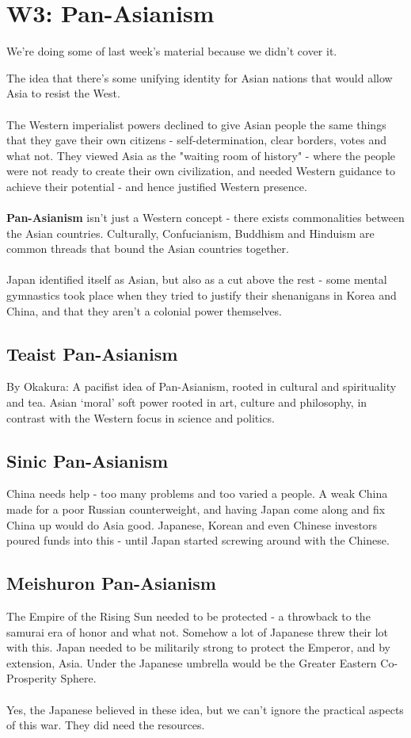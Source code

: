 \documentclass[a4paper]{article}
\begin{document}
\section{W3: Pan-Asianism}
\begin{displayquote}
	We're doing some of last week's material because we didn't cover it.
\end{displayquote}
The idea that there's some unifying identity for Asian nations that would allow Asia to resist the West.\\
\\
The Western imperialist powers declined to give Asian people the same things that they gave their own citizens - self-determination, clear borders, votes and what not. They viewed Asia as the "waiting room of history" - where the people were not ready to create their own civilization, and needed Western guidance to achieve their potential - and hence justified Western presence.\\
\\
\textbf{Pan-Asianism} isn't just a Western concept - there exists commonalities between the Asian countries. Culturally, Confucianism, Buddhism and Hinduism are common threads that bound the Asian countries together.\\
\\
Japan identified itself as Asian, but also as a cut above the rest - some mental gymnastics took place when they tried to justify their shenanigans in Korea and China, and that they aren't a colonial power themselves. 
\subsection{Teaist Pan-Asianism}
By Okakura: A pacifist idea of Pan-Asianism, rooted in cultural and spirituality and tea. Asian `moral' soft power rooted in art, culture and philosophy, in contrast with the Western focus in science and politics.
\subsection{Sinic Pan-Asianism}
China needs help - too many problems and too varied a people. A weak China made for a poor Russian counterweight, and having Japan come along and fix China up would do Asia good. Japanese, Korean and even Chinese investors poured funds into this - until Japan started screwing around with the Chinese.
\subsection{Meishuron Pan-Asianism}
The Empire of the Rising Sun needed to be protected - a throwback to the samurai era of honor and what not. Somehow  a lot of Japanese threw their lot with this. Japan needed to be militarily strong to protect the Emperor, and by extension, Asia. Under the Japanese umbrella would be the Greater Eastern Co-Prosperity Sphere.\\
\\
Yes, the Japanese believed in these idea, but we can't ignore the practical aspects of this war. They did need the resources.
\end{document}
